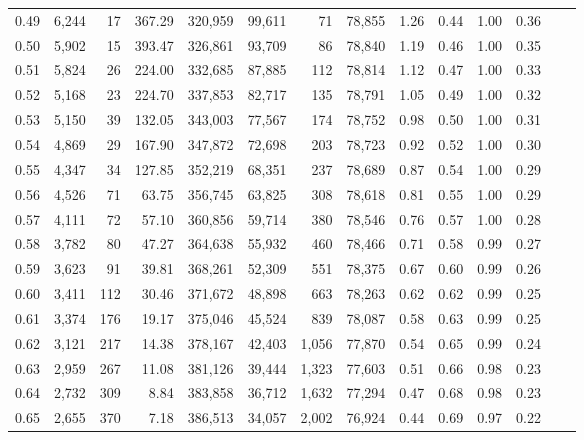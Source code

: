 \begin{tabular}{rrrrrrrrrrrrrr}
0.49 &  6,244 &     17 &   367.29 &  320,959 &   99,611 &      71 &  78,855 &  1.26 &  0.44 &  1.00 &      0.36 \\
0.50 &  5,902 &     15 &   393.47 &  326,861 &   93,709 &      86 &  78,840 &  1.19 &  0.46 &  1.00 &      0.35 \\
0.51 &  5,824 &     26 &   224.00 &  332,685 &   87,885 &     112 &  78,814 &  1.12 &  0.47 &  1.00 &      0.33 \\
0.52 &  5,168 &     23 &   224.70 &  337,853 &   82,717 &     135 &  78,791 &  1.05 &  0.49 &  1.00 &      0.32 \\
0.53 &  5,150 &     39 &   132.05 &  343,003 &   77,567 &     174 &  78,752 &  0.98 &  0.50 &  1.00 &      0.31 \\
0.54 &  4,869 &     29 &   167.90 &  347,872 &   72,698 &     203 &  78,723 &  0.92 &  0.52 &  1.00 &      0.30 \\
0.55 &  4,347 &     34 &   127.85 &  352,219 &   68,351 &     237 &  78,689 &  0.87 &  0.54 &  1.00 &      0.29 \\
0.56 &  4,526 &     71 &    63.75 &  356,745 &   63,825 &     308 &  78,618 &  0.81 &  0.55 &  1.00 &      0.29 \\
0.57 &  4,111 &     72 &    57.10 &  360,856 &   59,714 &     380 &  78,546 &  0.76 &  0.57 &  1.00 &      0.28 \\
0.58 &  3,782 &     80 &    47.27 &  364,638 &   55,932 &     460 &  78,466 &  0.71 &  0.58 &  0.99 &      0.27 \\
0.59 &  3,623 &     91 &    39.81 &  368,261 &   52,309 &     551 &  78,375 &  0.67 &  0.60 &  0.99 &      0.26 \\
0.60 &  3,411 &    112 &    30.46 &  371,672 &   48,898 &     663 &  78,263 &  0.62 &  0.62 &  0.99 &      0.25 \\
0.61 &  3,374 &    176 &    19.17 &  375,046 &   45,524 &     839 &  78,087 &  0.58 &  0.63 &  0.99 &      0.25 \\
0.62 &  3,121 &    217 &    14.38 &  378,167 &   42,403 &   1,056 &  77,870 &  0.54 &  0.65 &  0.99 &      0.24 \\
0.63 &  2,959 &    267 &    11.08 &  381,126 &   39,444 &   1,323 &  77,603 &  0.51 &  0.66 &  0.98 &      0.23 \\
0.64 &  2,732 &    309 &     8.84 &  383,858 &   36,712 &   1,632 &  77,294 &  0.47 &  0.68 &  0.98 &      0.23 \\
0.65 &  2,655 &    370 &     7.18 &  386,513 &   34,057 &   2,002 &  76,924 &  0.44 &  0.69 &  0.97 &      0.22 \\

\end{tabular}
